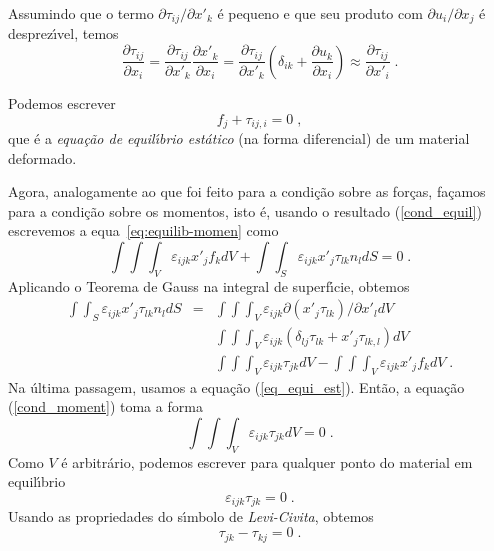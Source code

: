 %
Assumindo que o termo $\partial \tau_{ij}/\partial x'_k$ \'e pequeno e
que seu produto com $\partial u_i/\partial x_j$ \'e
desprez\'{\i}vel, temos
\begin{equation}
\frac {\partial \tau_{ij}}{\partial x_i} = \frac {\partial
\tau_{ij}}{\partial x'_k} \frac {\partial x'_k}{\partial x_i}=\frac
{\partial \tau_{ij}}{\partial x'_k} \left(
\delta_{ik}+\frac{\partial u_k}{\partial x_i} \right) \approx \frac
{\partial \tau_{ij}}{\partial x'_i} \;. \label{eq_equi_back2}
\end{equation}

Podemos escrever
\begin{equation}
f_j + \tau_{ij,i} = 0 \;, \label{eq_equi_est}
\end{equation}
%
que \'e a {\it equa\c{c}\~ao de equil\'{\i}brio est\'atico} (na
forma diferencial) de um material deformado.

Agora, analogamente ao que foi feito para a condi\c{c}\~ao sobre
as for\c{c}as, fa\c{c}amos para a condi\c{c}\~ao sobre os
momentos, isto \'e, usando o resultado (\ref{cond_equil})
escrevemos a equa\cao\ \ref{eq:equilib-momen} como
\begin{equation}
\int \!\! \int \!\! \int_V \varepsilon_{ijk} x'_j f_k dV + \int
\!\! \int_S \varepsilon_{ijk} x'_j \tau_{lk}n_l dS = 0 \;.
\label{cond_moment}
\end{equation}
Aplicando o Teorema de Gauss na integral de superf\'{\i}cie,
obtemos
\begin{equation}
\begin{array}{rcl}
\int \!\! \int_S \varepsilon_{ijk} x'_j \tau_{lk}n_l dS &=& \int
\!\! \int \!\! \int_V  \varepsilon_{ijk} \partial (x'_j
\tau_{lk})/\partial x'_l dV  \\
&& \int \!\! \int \!\! \int_V  \varepsilon_{ijk} (\delta_{lj} \tau_{lk} + x'_j \tau_{lk,l}) dV \\
&& \int \!\! \int \!\! \int_V  \varepsilon_{ijk} \tau_{jk} dV -
\int \!\! \int \!\! \int_V  \varepsilon_{ijk} x'_j f_k dV \;.
\end{array}
\end{equation}
Na \'ultima passagem, usamos a equa\c{c}\~ao (\ref{eq_equi_est}).
Ent\~ao, a equa\c{c}\~ao (\ref{cond_moment}) toma a forma
\begin{equation}
\int \!\! \int \!\! \int_V  \varepsilon_{ijk} \tau_{jk} dV =0\;.
\label{cond_moment1}
\end{equation}
Como $V$ \'e arbitr\'ario, podemos escrever para qualquer ponto do
material em equil\'{\i}brio
\begin{equation}
\varepsilon_{ijk} \tau_{jk}=0\;.
\end{equation}
Usando as propriedades do s\'{\i}mbolo de {\it Levi-Civita},
obtemos
\begin{equation}
\tau_{jk}-\tau_{kj}=0\;.
\end{equation}

